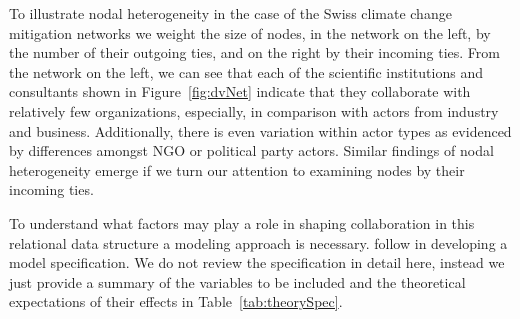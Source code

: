 \documentclass[12pt,pdflatex]{elsarticle}
\begin{document}
To illustrate nodal heterogeneity in the case of the Swiss climate change mitigation networks we weight the size of nodes, in the network on the left, by the number of their outgoing ties, and on the right by their incoming ties. From the network on the left, we can see that each of the scientific institutions and consultants shown in Figure~\ref{fig:dvNet} indicate that they collaborate with relatively few organizations, especially, in comparison with actors from industry and business. Additionally, there is even variation within actor types as evidenced by differences amongst NGO or political party actors. Similar findings of nodal heterogeneity emerge if we turn our attention to examining nodes by their incoming ties. 

To understand what factors may play a role in shaping collaboration in this relational data structure a modeling approach is necessary. \citet{cranmer:etal:2016} follow \citet{ingold:fischer:2014} in developing a model specification. We do not review the specification in detail here, instead we just provide a summary of the variables to be included and the theoretical expectations of their effects in Table~\ref{tab:theorySpec}. 
\end{document}
